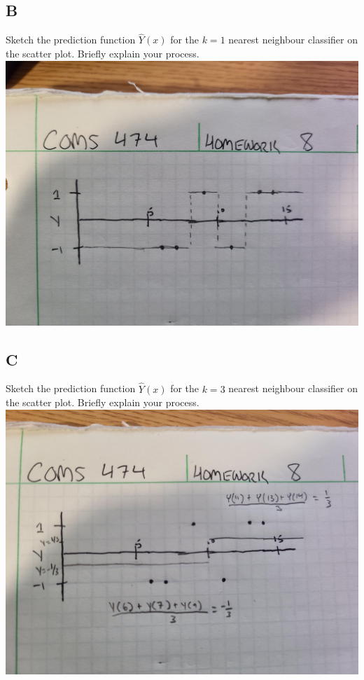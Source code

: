 \documentclass[12pt]{article}
\begin{document}
\subsection{B}
Sketch the prediction function $\hat{Y}(x)$ for the $k = 1$ nearest neighbour classifier on the scatter plot. Briefly explain your process.\\
\includegraphics[width=1\textwidth]{p1.b.jpg}
\subsection{C}
Sketch the prediction function $\hat{Y}(x)$ for the $k = 3$ nearest neighbour classifier on the scatter plot. Briefly explain your process.\\
\includegraphics[width=1\textwidth]{p1.c.jpg}
\end{document}
